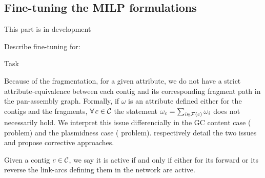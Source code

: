 \subsection{Fine-tuning the MILP formulations}

\begin{warningbox}
  This part is in development
\end{warningbox}

\begin{todobox}
  Describe fine-tuning for:
  \begin{CheckList}{Task}
  \end{CheckList}
\end{todobox}

Because of the fragmentation, for a given attribute, we do not have a strict attribute-equivalence between each contig and its corresponding fragment path in the pan-assembly graph.
Formally, if \(\omega{}\) is an attribute defined either for the contigs and the fragments, \(\forall c \in \Contigs{}\) the statement \(\omega_c = \sum_{i \in \mathcal{F}{}(c)} \omega_i\) does not necessarily hold.
We interpret this issue differencially in the GC content case (\MGC{} problem) and the plasmidness case (\MPS{} problem).
 respectively detail the two issues and propose corrective approaches.

Given a contig \(c \in \mathcal{C}{}\), we say it is active if and only if either for its forward or its reverse the link-arcs defining them in the network are active.




